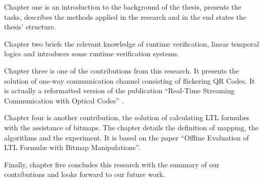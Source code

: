 Chapter one is an introduction to the background of the thesis, presents the tasks, describes the methods applied in the research and in the end states the thesis' structure.

Chapter two briefs the relevant knowledge of runtime verification, linear temporal logics and introduces some runtime verification systems.

Chapter three is one of the contributions from this research. It presents the solution of one-way communication channel consisting of flickering QR Codes. It is actually a reformatted version of the publication ``Real-Time Streaming Communication with Optical Codes'' \citep{kxie7370891}.

Chapter four is another contribution, the solution of calculating LTL formul\ae{}s with the assistance of bitmaps. The chapter details the definition of mapping, the algorithms and the experiment. It is based on the paper ``Offline Evaluation of LTL Formulæ with Bitmap Manipulations''.

Finally, chapter five concludes this research with the summary of our contributions and looks forward to our future work.